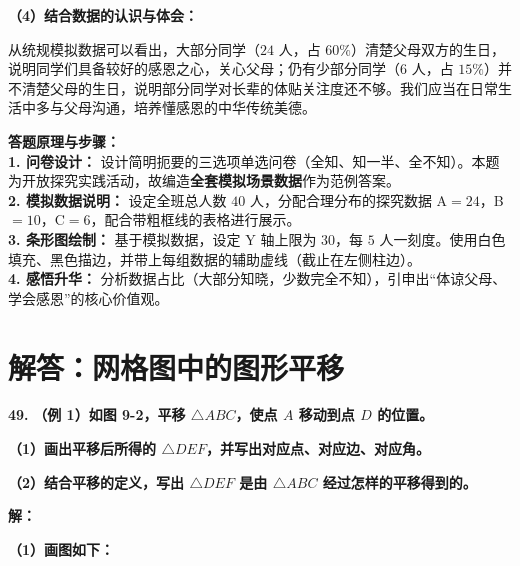 \documentclass[12pt, a4paper]{ctexrep}
\begin{document}
\vspace{0.4cm}
\textbf{（4）结合数据的认识与体会：}

从统规模拟数据可以看出，大部分同学（$24$ 人，占 $60\%$）清楚父母双方的生日，说明同学们具备较好的感恩之心，关心父母；仍有少部分同学（$6$ 人，占 $15\%$）并不清楚父母的生日，说明部分同学对长辈的体贴关注度还不够。我们应当在日常生活中多与父母沟通，培养懂感恩的中华传统美德。

\vspace{0.4cm}
{\small\color{blue!70!black}
\textbf{答题原理与步骤：}\\
\textbf{1. 问卷设计：} 设计简明扼要的三选项单选问卷（全知、知一半、全不知）。本题为开放探究实践活动，故编造\textbf{全套模拟场景数据}作为范例答案。\\
\textbf{2. 模拟数据说明：} 设定全班总人数 $40$ 人，分配合理分布的探究数据 A$=24$，B$=10$，C$=6$，配合带粗框线的表格进行展示。\\
\textbf{3. 条形图绘制：} 基于模拟数据，设定 Y 轴上限为 $30$，每 $5$ 人一刻度。使用白色填充、黑色描边，并带上每组数据的辅助虚线（截止在左侧柱边）。\\
\textbf{4. 感悟升华：} 分析数据占比（大部分知晓，少数完全不知），引申出“体谅父母、学会感恩”的核心价值观。
}

\newpage

\section{解答：网格图中的图形平移}

\vspace{0.6cm}

\textbf{\LARGE 49.} \textbf{（例 1）如图 9-2，平移 $\triangle ABC$，使点 $A$ 移动到点 $D$ 的位置。}

\textbf{（1）画出平移后所得的 $\triangle DEF$，并写出对应点、对应边、对应角。}

\textbf{（2）结合平移的定义，写出 $\triangle DEF$ 是由 $\triangle ABC$ 经过怎样的平移得到的。}

\vspace{0.4cm}
\textbf{解：}

\textbf{（1）画图如下：}
\end{document}
